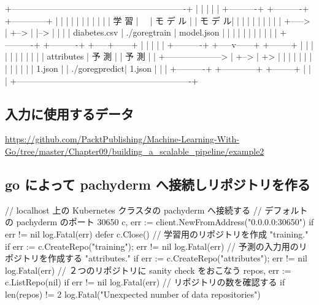 \documentclass[mingoth,a4paper]{jsarticle}
\begin{document}
\begin{commandline}
     +-------------------------------------------------------------+
     |                                                             |
     |                                                             |
     |  +----------+    +----------+    +------------+             |
     |  |          |    |          |    |            |             |
     |  |  学   習 |  　| モ デ ル |    |  モ  デ  ル|             |
     |  |          |    |          |    |            |             |
+-----> |          +--> |          |--> |            |             |
     |  diabetes.csv    | ./goregtrain  | model.json |             |
     |  |          |    |          |    |            |             |
     |  +----------+    +----------+    +-----+------+             |
     |                                        |                    |
     |                  +----------+    +-----v------+  +--------+ |
     |                  |          |    |            |  |        | |
     |                  | attributes    | 予  測     |  | 予  測 | |
 +--------------------> |          +--> |            +> |        | |
     |                  |          |    |            |  |        | |
     |                  | 1.json   |    | ./goregpredict| 1.json | |
     |                  +----------+    +------------+  +--------+ |
     |                                                             |
     +-------------------------------------------------------------+
\end{commandline}
     
\subsection{入力に使用するデータ}
\url{https://github.com/PacktPublishing/Machine-Learning-With-Go/tree/master/Chapter09/building_a_scalable_pipeline/example2}

\subsection{go によって pachyderm へ接続しリポジトリを作る}
\begin{commandline}
// localhost 上の Kubernetes クラスタの pachyderm へ接続する
// デフォルトの pachyderm のポート 30650
c, err := client.NewFromAddress("0.0.0.0:30650")
if err != nil {
log.Fatal(err)
}
defer c.Close()
// 学習用のリポジトリを作成 "training."
if err := c.CreateRepo("training"); err != nil {
log.Fatal(err)
}
// 予測の入力用のリポジトリを作成する "attributes."
if err := c.CreateRepo("attributes"); err != nil {
log.Fatal(err)
}
// ２つのリポジトリに sanity check をおこなう
repos, err := c.ListRepo(nil)
if err != nil {
log.Fatal(err)
}
// リポジトリの数を確認する
if len(repos) != 2 {
log.Fatal("Unexpected number of data repositories")
}
\end{commandline}
\end{document}
